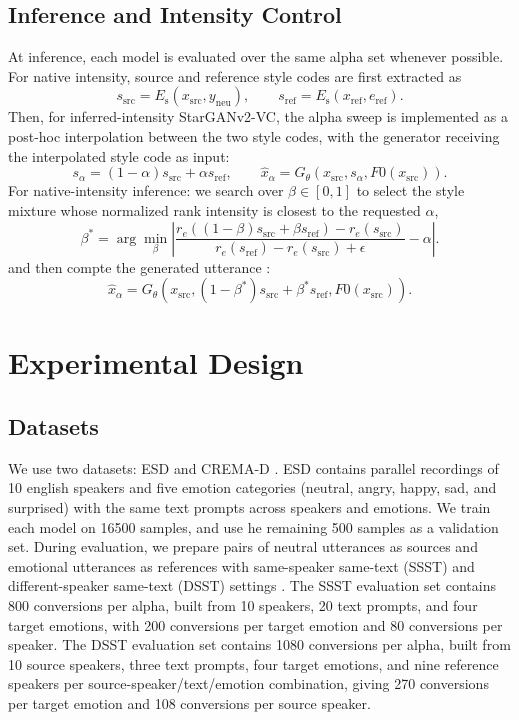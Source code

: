 \subsection{Inference and Intensity Control}
At inference, each model is evaluated over the same alpha set whenever possible.
For native intensity, source and reference style codes are first extracted as
\begin{equation}
s_{\mathrm{src}}=E_{\text{s}}(x_{\mathrm{src}},y_{\mathrm{neu}}),\qquad
s_{\mathrm{ref}}=E_{\text{s}}(x_{\mathrm{ref}},e_{\mathrm{ref}}).
\end{equation}
Then, for inferred-intensity StarGANv2-VC, the alpha sweep is implemented as a post-hoc interpolation between the two style codes, with the generator receiving the interpolated style code as input:
\begin{equation}
s_{\alpha}=(1-\alpha)s_{\mathrm{src}}+\alpha s_{\mathrm{ref}},
\qquad
\hat{x}_{\alpha}=G_{\theta}(x_{\mathrm{src}},s_{\alpha},F0(x_{\mathrm{src}})).
\end{equation}
For native-intensity inference: we search over $\beta\in[0,1]$ to select the style mixture whose normalized rank intensity is closest to the requested $\alpha$,
\begin{equation}
\beta^{*}
=
\arg\min_{\beta}
\left|
\frac{r_e((1-\beta)s_{\mathrm{src}}+\beta s_{\mathrm{ref}})-r_e(s_{\mathrm{src}})}
{r_e(s_{\mathrm{ref}})-r_e(s_{\mathrm{src}})+\epsilon}
-\alpha
\right|.
\end{equation}
and then compte the generated utterance :
\begin{equation}
\hat{x}_{\alpha}=G_{\theta}(x_{\mathrm{src}},(1-\beta^{*})s_{\mathrm{src}}+\beta^{*} s_{\mathrm{ref}},F0(x_{\mathrm{src}})).
\end{equation}

\section{Experimental Design}
\label{sec:experimental-design}

\subsection{Datasets}
We use two datasets: ESD \cite{zhou2021seen} and CREMA-D \cite{cao2014cremad}.
ESD contains parallel recordings of 10 english speakers and five emotion categories (neutral, angry, happy, sad, and surprised) with the same text prompts across speakers and emotions. We train each model on 16500 samples, and use he remaining 500 samples as a validation set.
During evaluation, we prepare pairs of neutral utterances as sources and emotional utterances as references with same-speaker same-text (SSST) and different-speaker same-text (DSST) settings \cite{zhou2021seen}. The SSST evaluation set contains 800 conversions per alpha, built from 10 speakers, 20 text prompts, and four target emotions, with 200 conversions per target emotion and 80 conversions per speaker.
The DSST evaluation set contains 1080 conversions per alpha, built from 10 source speakers, three text prompts, four target emotions, and nine reference speakers per source-speaker/text/emotion combination, giving 270 conversions per target emotion and 108 conversions per source speaker.

